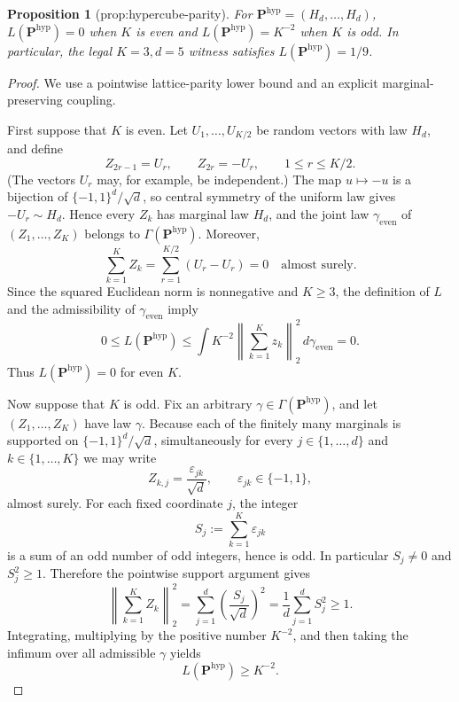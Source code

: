 \documentclass{article}
\newtheorem{proposition}{Proposition}
\begin{document}
\begin{proposition}[prop:hypercube-parity]\label{prop:hypercube-parity}
For \(\mathbf P^{\mathrm{hyp}}=(H_d,\ldots,H_d)\), \(L(\mathbf P^{\mathrm{hyp}})=0\) when \(K\) is even and \(L(\mathbf P^{\mathrm{hyp}})=K^{-2}\) when \(K\) is odd. In particular, the legal \(K=3,d=5\) witness satisfies \(L(\mathbf P^{\mathrm{hyp}})=1/9\).
\end{proposition}
\begin{proof}
We use a pointwise lattice-parity lower bound and an explicit marginal-preserving coupling.

First suppose that \(K\) is even.  Let \(U_1,\ldots,U_{K/2}\) be random vectors with law \(H_d\), and define
\[
 Z_{2r-1}=U_r,
 \qquad
 Z_{2r}=-U_r,
 \qquad 1\le r\le K/2.
\]
(The vectors \(U_r\) may, for example, be independent.)  The map \(u\mapsto-u\) is a bijection of \(\{-1,1\}^d/\sqrt d\), so central symmetry of the uniform law gives \(-U_r\sim H_d\).  Hence every \(Z_k\) has marginal law \(H_d\), and the joint law \(\gamma_{\mathrm{even}}\) of \((Z_1,\ldots,Z_K)\) belongs to \(\Gamma(\mathbf P^{\mathrm{hyp}})\).  Moreover,
\[
 \sum_{k=1}^K Z_k
 =\sum_{r=1}^{K/2}(U_r-U_r)=0
 \quad\text{almost surely}.
\]
Since the squared Euclidean norm is nonnegative and \(K\ge3\), the definition of \(L\) and the admissibility of \(\gamma_{\mathrm{even}}\) imply
\[
 0\le L(\mathbf P^{\mathrm{hyp}})
 \le \int K^{-2}\left\|\sum_{k=1}^Kz_k\right\|_2^2
 \,d\gamma_{\mathrm{even}}=0.
\]
Thus \(L(\mathbf P^{\mathrm{hyp}})=0\) for even \(K\).

Now suppose that \(K\) is odd.  Fix an arbitrary \(\gamma\in\Gamma(\mathbf P^{\mathrm{hyp}})\), and let \((Z_1,\ldots,Z_K)\) have law \(\gamma\).  Because each of the finitely many marginals is supported on \(\{-1,1\}^d/\sqrt d\), simultaneously for every \(j\in\{1,\ldots,d\}\) and \(k\in\{1,\ldots,K\}\) we may write
\[
 Z_{k,j}=\frac{\varepsilon_{jk}}{\sqrt d},
 \qquad \varepsilon_{jk}\in\{-1,1\},
\]
almost surely.  For each fixed coordinate \(j\), the integer
\[
 S_j:=\sum_{k=1}^K\varepsilon_{jk}
\]
is a sum of an odd number of odd integers, hence is odd.  In particular \(S_j\ne0\) and \(S_j^2\ge1\).  Therefore the pointwise support argument gives
\[
 \left\|\sum_{k=1}^K Z_k\right\|_2^2
 =\sum_{j=1}^d\left(\frac{S_j}{\sqrt d}\right)^2
 =\frac1d\sum_{j=1}^d S_j^2
 \ge1.
\]
Integrating, multiplying by the positive number \(K^{-2}\), and then taking the infimum over all admissible \(\gamma\) yields
\[
 L(\mathbf P^{\mathrm{hyp}})\ge K^{-2}.
\]


\end{proof}
\end{document}
